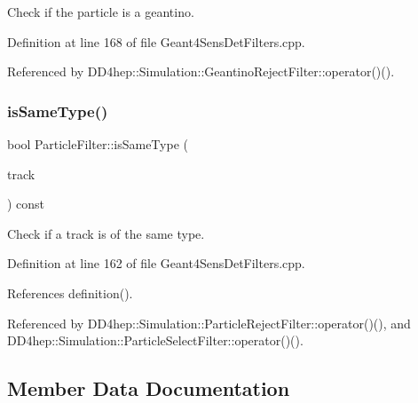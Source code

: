 Check if the particle is a geantino. 



Definition at line 168 of file Geant4\+Sens\+Det\+Filters.\+cpp.



Referenced by D\+D4hep\+::\+Simulation\+::\+Geantino\+Reject\+Filter\+::operator()().

\hypertarget{struct_d_d4hep_1_1_simulation_1_1_particle_filter_ac3ec79d2ac19acb431b1ea060b278f2c}{}\label{struct_d_d4hep_1_1_simulation_1_1_particle_filter_ac3ec79d2ac19acb431b1ea060b278f2c} 
\subsubsection{\texorpdfstring{is\+Same\+Type()}{isSameType()}}
{\footnotesize\ttfamily bool Particle\+Filter\+::is\+Same\+Type (\begin{DoxyParamCaption}\item[{const G4\+Track $\ast$}]{track }\end{DoxyParamCaption}) const}



Check if a track is of the same type. 



Definition at line 162 of file Geant4\+Sens\+Det\+Filters.\+cpp.



References definition().



Referenced by D\+D4hep\+::\+Simulation\+::\+Particle\+Reject\+Filter\+::operator()(), and D\+D4hep\+::\+Simulation\+::\+Particle\+Select\+Filter\+::operator()().



\subsection{Member Data Documentation}
\hypertarget{struct_d_d4hep_1_1_simulation_1_1_particle_filter_ae3cc90b48466de4f0a7d38544db44024}{}\label{struct_d_d4hep_1_1_simulation_1_1_particle_filter_ae3cc90b48466de4f0a7d38544db44024} 
